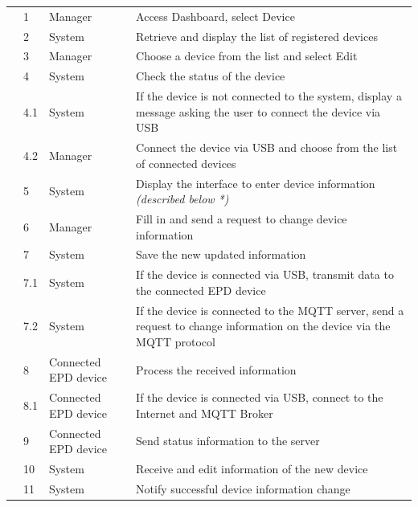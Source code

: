 \documentclass[../Main.tex]{subfiles}
\begin{document}
{\begin{longtable}{|L{2cm}|L{1cm}|L{2cm}|L{7cm}|}
        & 1     & Manager               & Access Dashboard, select Device \\ 
        & 2     & System                & Retrieve and display the list of registered devices \\ 
        & 3     & Manager               & Choose a device from the list and select Edit \\ 
        & 4     & System                & Check the status of the device \\ 
        & 4.1   & System                & If the device is not connected to the system, display a message asking the user to connect the device via USB \\ 
        & 4.2   & Manager               & Connect the device via USB and choose from the list of connected devices \\ 
        & 5     & System                & Display the interface to enter device information \textit{(described below *)} \\ 
        & 6     & Manager               & Fill in and send a request to change device information \\ 
        & 7     & System                & Save the new updated information \\ 
        & 7.1   & System                & If the device is connected via USB, transmit data to the connected \gls{EPD} device \\ 
        & 7.2   & System                & If the device is connected to the MQTT server, send a request to change information on the device via the MQTT protocol \\ 
        & 8     & Connected \gls{EPD} device  & Process the received information \\ 
        & 8.1   & Connected \gls{EPD} device  & If the device is connected via USB, connect to the Internet and MQTT Broker \\ 
        & 9     & Connected \gls{EPD} device  & Send status information to the server \\ 
        & 10    & System                & Receive and edit information of the new device \\ 
        & 11    & System                & Notify successful device information change \\ \hline


\end{longtable}}
\end{document}
